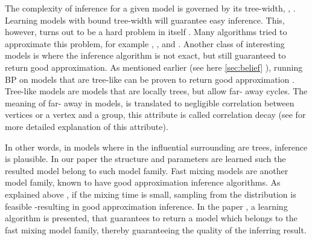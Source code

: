 The complexity of inference for a given model is governed by its tree-width, \cite{robertson1983graph}, \cite{robertson1994quickly}.
Learning models with bound tree-width will guarantee easy inference.
This, however, turns out to be a hard problem in itself \cite{srebro2001maximum}.
Many algorithms tried to approximate this problem, for example \cite{karger2001learning}, \cite{bach2001thin}, and \cite{elidan2009learning}.
%
Another class of interesting models is where the inference algorithm is not exact, but still guaranteed to return good approximation. 
As mentioned earlier (see here \ref{sec:belief} ), running BP on models that are tree-like can be proven to return good approximation \cite{dembo2010ising}.
Tree-like models are models that are locally trees, but allow far- away cycles.
The meaning of far- away in models, is translated to negligible correlation between vertices or a vertex and a group, this attribute is called correlation decay (see  for more detailed explanation of this attribute).
In other words, in models where in the influential surrounding are trees, inference is plausible.
In our paper \cite{heinemann2014inferning} the structure and parameters are learned such the resulted model belong to such model family.
%
Fast mixing models are another model family,  known to have good approximation inference algorithms.
As explained above  , if the mixing time is small, sampling from the distribution is feasible -resulting in good approximation inference. 
In the paper \cite{domke2015maximum}, a learning algorithm is presented, that guarantees to return a model which belongs to the fast mixing model family,
thereby guaranteeing the quality of the inferring result.
